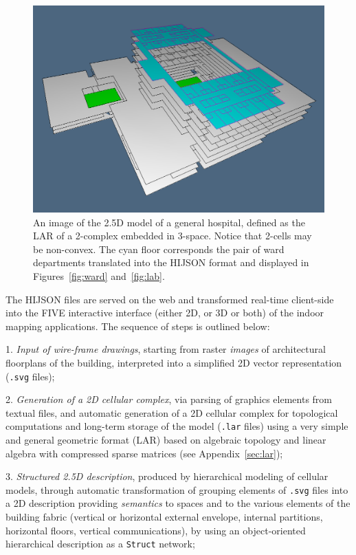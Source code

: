 \begin{figure}[ptb] %
 \centering
 \includegraphics[width=\linewidth]{images/hospital2} 
 \caption{An image of the 2.5D model of a general hospital, defined as the LAR of a 2-complex embedded in 3-space. Notice that 2-cells may be non-convex. The cyan floor corresponds the pair of ward departments translated into the HIJSON format and displayed in Figures~\ref{fig:ward} and~\ref{fig:lab}.}
 \label{fig:hospital2}
\end{figure}

 The HIJSON  files are served on the web and transformed real-time client-side into the FIVE interactive interface (either 2D, or 3D or both) of the indoor mapping applications. The sequence of steps is outlined below:

1. \textit{Input of wire-frame drawings},
  starting from   raster \emph{images} of architectural floorplans of the building, interpreted into a simplified 2D vector representation (\texttt{.svg} files);

2. \textit{Generation of a 2D cellular complex}, via
  parsing of graphics elements from textual files, and automatic generation of a 2D cellular complex for topological computations and long-term storage of the model (\texttt{.lar} files) using a very simple and general geometric format (LAR) based on algebraic topology and linear algebra with compressed sparse matrices (see Appendix~\ref{sec:lar});

3. \textit{Structured 2.5D description}, produced by
  hierarchical modeling of cellular models, through automatic transformation of grouping elements of \texttt{.svg} files into a 2D description providing \emph{semantics} to spaces and  to the various elements of the building fabric (vertical or horizontal external envelope, internal partitions, horizontal floors, vertical communications), by using an object-oriented hierarchical description as a  \texttt{Struct} network;

